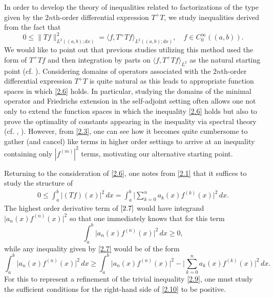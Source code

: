 \documentclass[reqno,10pt,centertags]{amsart}
\newcommand{\norm}[1]{\lVert#1\rVert}
\newcommand{\Lt}{{L^2((a,b);dx)}}
\numberwithin{equation}{section}
\theoremstyle{remark}
\begin{document}
In order to develop the theory of inequalities related to factorizations of the type given by the $2n$th-order differential expression $T^+T$, we study inequalities derived from the fact that
\begin{equation}\label{2.6}
0\leq\norm{Tf}^2_{\Lt}=\langle f,T^+Tf\rangle_\Lt,\quad f\in C_0^\infty((a,b)).
\end{equation}
We would like to point out that previous studies utilizing this method used the form of $T^+Tf$ and then integration by parts on $\langle f,T^+Tf\rangle_{L^2}$ as the natural starting point (cf. \cite{GL18,GPPS23,GPS24}). Considering domains of operators associated with the $2n$th-order differential expression $T^+T$ is quite natural as this leads to appropriate function spaces in which \eqref{2.6} holds. In particular, studying the domains of the minimal operator and Friedrichs extension in the self-adjoint setting often allows one not only to extend the function spaces in which the inequality \eqref{2.6} holds but also to prove the optimality of constants appearing in the inequality via spectral theory (cf. \cite[Sect. 5.1]{FS25}, \cite{GPS21}). However, from  \eqref{2.3}, one can see how it becomes quite cumbersome to gather (and cancel) like terms in higher order settings to arrive at an inequality containing only $|f^{(m)}|^2$ terms, motivating our alternative starting point. 

Returning to the consideration of \eqref{2.6}, one notes from \eqref{2.1} that it suffices to study the structure of
\begin{align}\label{2.7}
0\leq\int_a^b |(Tf)(x)|^2 \, dx=\int_a^b \bigg|\sum_{k=0}^n a_k(x) f^{(k)}(x)\bigg|^2\, dx.
\end{align}
The highest order derivative term of $\eqref{2.7}$ would have integrand $\big|a_n(x)f^{(n)}(x)\big|^2$ so that one immediately knows that for this term
\begin{equation}\label{2.9}
\int_a^b \big|a_n(x)f^{(n)}(x)\big|^2\, dx\geq0,
\end{equation}
while any inequality given by \eqref{2.7} would be of the form
\begin{equation}\label{2.10}
\int_a^b \big|a_n(x)f^{(n)}(x)\big|^2\, dx\geq \int_a^b \big|a_n(x)f^{(n)}(x)\big|^2-\bigg|\sum_{k=0}^n a_k(x) f^{(k)}(x)\bigg|^2\, dx.
\end{equation}
For this to represent a refinement of the trivial inequality \eqref{2.9}, one must study the sufficient conditions for the right-hand side of \eqref{2.10} to be positive.
\end{document}
